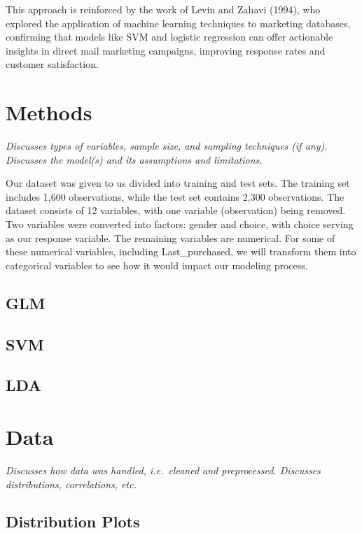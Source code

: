 \documentclass[
]{article}
\begin{document}
This approach is reinforced by the work of Levin and Zahavi (1994), who
explored the application of machine learning techniques to marketing
databases, confirming that models like SVM and logistic regression can
offer actionable insights in direct mail marketing campaigns, improving
response rates and customer satisfaction.

\hypertarget{methods}{%
\section{Methods}\label{methods}}

\emph{Discusses types of variables, sample size, and sampling techniques
(if any). Discusses the model(s) and its assumptions and limitations.}

Our dataset was given to us divided into training and test sets. The
training set includes 1,600 observations, while the test set contains
2,300 observations. The dataset consists of 12 variables, with one
variable (observation) being removed. Two variables were converted into
factors: gender and choice, with choice serving as our response
variable. The remaining variables are numerical. For some of these
numerical variables, including Last\_purchased, we will transform them
into categorical variables to see how it would impact our modeling
process.

\hypertarget{glm}{%
\subsection{GLM}\label{glm}}

\hypertarget{svm}{%
\subsection{SVM}\label{svm}}

\hypertarget{lda}{%
\subsection{LDA}\label{lda}}

\hypertarget{data}{%
\section{Data}\label{data}}

\emph{Discusses how data was handled, i.e.~cleaned and preprocessed.
Discusses distributions, correlations, etc.}

\hypertarget{distribution-plots}{%
\subsection{Distribution Plots}\label{distribution-plots}}
\end{document}
